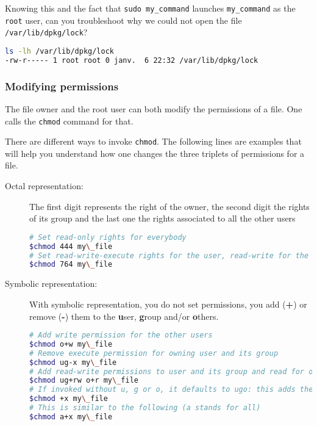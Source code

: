 \documentclass[12pt]{article}
\begin{document}
Knowing this and the fact that \texttt{sudo my\_command} launches \texttt{my\_command} as the \texttt{root} user, can you troubleshoot why we could not open the file \texttt{/var/lib/dpkg/lock}?

\begin{lstlisting}[language=bash]
ls -lh /var/lib/dpkg/lock
-rw-r----- 1 root root 0 janv.  6 22:32 /var/lib/dpkg/lock
\end{lstlisting}

\subsubsection{Modifying permissions}

The file owner and the root user can both modify the permissions of a file. One calls the \texttt{chmod} command for that.

There are different ways to invoke \texttt{chmod}. The following lines are examples that will help you understand how one changes the three triplets of permissions for a file.


\begin{description}
	\item[Octal representation:] The first digit represents the right of the owner, the second digit the rights of its group and the last one the rights associated to all the other users

\begin{lstlisting}[language=bash]
# Set read-only rights for everybody
$chmod 444 my\_file
# Set read-write-execute rights for the user, read-write for the users of its group and read-only for other users
$chmod 764 my\_file
\end{lstlisting}

	\item[Symbolic representation:] With symbolic representation, you do not set permissions, you add (\textbf{+}) or remove (\textbf{-}) them to the \textbf{u}ser, \textbf{g}roup and/or \textbf{o}thers.

\begin{lstlisting}[language=bash]
# Add write permission for the other users
$chmod o+w my\_file
# Remove execute permission for owning user and its group
$chmod ug-x my\_file
# Add read-write permissions to user and its group and read for others
$chmod ug+rw o+r my\_file
# If invoked without u, g or o, it defaults to ugo: this adds the execute permission on the file for all users
$chmod +x my\_file
# This is similar to the following (a stands for all)
$chmod a+x my\_file
\end{lstlisting}
\end{description}
\end{document}
